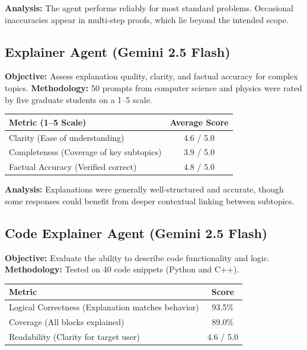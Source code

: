 \documentclass[12pt,a4paper]{article}
\begin{document}
\textbf{Analysis:} The agent performs reliably for most standard problems. Occasional inaccuracies appear in multi-step proofs, which lie beyond the intended scope.

\subsection{Explainer Agent (Gemini 2.5 Flash)}
\textbf{Objective:} Assess explanation quality, clarity, and factual accuracy for complex topics.
\textbf{Methodology:} 50 prompts from computer science and physics were rated by five graduate students on a 1–5 scale.

\begin{table}[H]
\centering
\begin{tabular}{lc}
\toprule
\textbf{Metric (1–5 Scale)} & \textbf{Average Score} \\
\midrule
Clarity (Ease of understanding) & 4.6 / 5.0 \\
Completeness (Coverage of key subtopics) & 3.9 / 5.0 \\
Factual Accuracy (Verified correct) & 4.8 / 5.0 \\
\bottomrule
\end{tabular}
\end{table}

\textbf{Analysis:} Explanations were generally well-structured and accurate, though some responses could benefit from deeper contextual linking between subtopics.

\subsection{Code Explainer Agent (Gemini 2.5 Flash)}
\textbf{Objective:} Evaluate the ability to describe code functionality and logic.\\\textbf{Methodology:} Tested on 40 code snippets (Python and C++).

\begin{table}[H]
\centering
\begin{tabular}{lc}
\toprule
\textbf{Metric} & \textbf{Score} \\
\midrule
Logical Correctness (Explanation matches behavior) & 93.5\% \\
Coverage (All blocks explained) & 89.0\% \\
Readability (Clarity for target user) & 4.6 / 5.0 \\
\bottomrule
\end{tabular}
\end{table}
\end{document}
